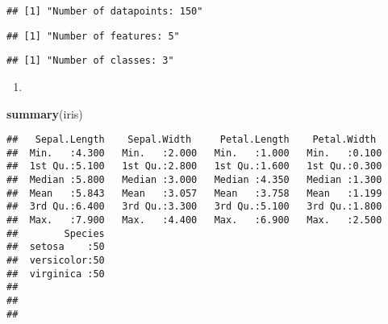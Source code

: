 \documentclass[]{article}
\newenvironment{Shaded}{\begin{snugshade}}{\end{snugshade}}
\newcommand{\KeywordTok}[1]{\textcolor[rgb]{0.13,0.29,0.53}{\textbf{#1}}}
\newcommand{\StringTok}[1]{\textcolor[rgb]{0.31,0.60,0.02}{#1}}
\newcommand{\OperatorTok}[1]{\textcolor[rgb]{0.81,0.36,0.00}{\textbf{#1}}}
\newcommand{\NormalTok}[1]{#1}
\begin{document}
\begin{verbatim}
## [1] "Number of datapoints: 150"
\end{verbatim}

\begin{Shaded}
\end{Shaded}

\begin{verbatim}
## [1] "Number of features: 5"
\end{verbatim}

\begin{Shaded}
\end{Shaded}

\begin{verbatim}
## [1] "Number of classes: 3"
\end{verbatim}

\begin{enumerate}
\def\labelenumi{\alph{enumi})}
\setcounter{enumi}{1}
\item
\end{enumerate}

\begin{Shaded}
\begin{Highlighting}[]
\KeywordTok{summary}\NormalTok{(iris)}
\end{Highlighting}
\end{Shaded}

\begin{verbatim}
##   Sepal.Length    Sepal.Width     Petal.Length    Petal.Width   
##  Min.   :4.300   Min.   :2.000   Min.   :1.000   Min.   :0.100  
##  1st Qu.:5.100   1st Qu.:2.800   1st Qu.:1.600   1st Qu.:0.300  
##  Median :5.800   Median :3.000   Median :4.350   Median :1.300  
##  Mean   :5.843   Mean   :3.057   Mean   :3.758   Mean   :1.199  
##  3rd Qu.:6.400   3rd Qu.:3.300   3rd Qu.:5.100   3rd Qu.:1.800  
##  Max.   :7.900   Max.   :4.400   Max.   :6.900   Max.   :2.500  
##        Species  
##  setosa    :50  
##  versicolor:50  
##  virginica :50  
##                 
##                 
## 
\end{verbatim}
\end{document}
